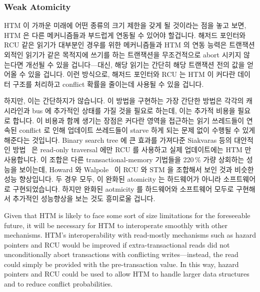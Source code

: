 \subsubsection{Weak Atomicity}
\label{sec:future:Weak Atomicity}

HTM 이 가까운 미래에 어떤 종류의 크기 제한을 갖게 될 것이라는 점을 놓고 보면,
HTM 은 다른 메커니즘들과 부드럽게 연동될 수 있어야 할겁니다.
해저드 포인터와 RCU 같은 읽기가 대부분인 경우를 위한 메커니즘들과 HTM 의 연동
능력은 트랜잭션 외적인 읽기가 같은 목적지에 쓰기를 하는 트랜잭션을 무조건적으로
abort 시키지 않는다면 개선될 수 있을 겁니다---대신, 해당 읽기는 간단히 해당
트랜잭션 전의 값을 얻어올 수 있을 겁니다.
이런 방식으로, 해저드 포인터와 RCU 는 HTM 이 커다란 데이터 구조를 처리하고
conflict 확률을 줄이는데 사용될 수 있을 겁니다.

하지만, 이는 간단하지가 않습니다.
이 방법을 구현하는 가장 간단한 방법은 각각의 캐시라인과 bus 에 추가적인 상태를
가질 것을 필요로 하는데, 이는 추가적 비용을 필요로 합니다.
이 비용과 함께 생기는 장점은 커다란 영역을 접근하는 읽기 쓰레드들이 연속된
conflict 로 인해 업데이트 쓰레드들이 starve 하게 되는 문제 없이 수행될 수 있게
해준다는 것입니다.
Binary search tree 에 큰 효과를 가져다준 Siakvaras 등의 대안적인
방법~\cite{Siakavaras2017CombiningHA} 은 read-only traversal 에만 RCU 를
사용하고 실제 업데이트에는 HTM 만 사용합니다.
이 조합은 다른 transactional-memory 기법들을 220\,\% 가량 상회하는 성능을
보이는데, Howard 와 Walpole~\cite{PhilHoward2011RCUTMRBTree} 이 RCU 와 STM 을
조합해서 보인 것과 비슷한 성능 향상입니다.
두 경우 모두, 이 완화된 atomicity 는 하드웨어가 아니라 소프트웨어로
구현되었습니다.
하지만 완화된 aotmicity 를 하드웨어와 소프트웨어 모두로 구현해서 추가적인
성능향상을 보는 것도 흥미로울 겁니다.
\iffalse

Given that HTM is likely to face some sort of size limitations for the
foreseeable future, it will be necessary for HTM to interoperate
smoothly with other mechanisms.
HTM's interoperability with read-mostly mechanisms such as hazard pointers
and RCU would be improved if extra-transactional reads did not
unconditionally abort transactions with conflicting writes---instead,
the read could simply be provided with the pre-transaction value.
In this way, hazard pointers and RCU could be used to allow HTM to handle
larger data structures and to reduce conflict probabilities.

